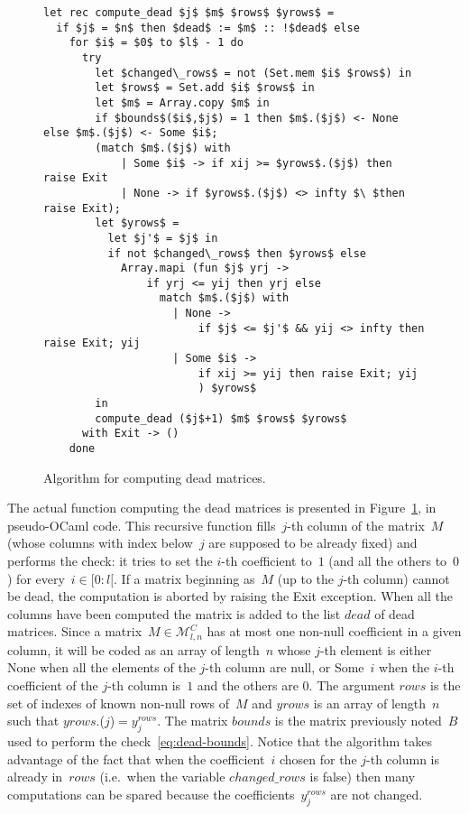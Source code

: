 \documentclass[orivec]{llncs} \usepackage[T1]{fontenc}
\newcommand{\Nint}[2]{[#1:#2[}
\newcommand{\ie}{i.e.~}
\newcommand{\Mat}{\mathcal{M}}
\begin{document}
\begin{figure}[t]
{  \centering
{\small
\begin{lstlisting}
let rec compute_dead $j$ $m$ $rows$ $yrows$ =
  if $j$ = $n$ then $dead$ := $m$ :: !$dead$ else
    for $i$ = $0$ to $l$ - 1 do
      try
        let $changed\_rows$ = not (Set.mem $i$ $rows$) in
        let $rows$ = Set.add $i$ $rows$ in
        let $m$ = Array.copy $m$ in
        if $bounds$($i$,$j$) = 1 then $m$.($j$) <- None else $m$.($j$) <- Some $i$;
        (match $m$.($j$) with
            | Some $i$ -> if xij >= $yrows$.($j$) then raise Exit
            | None -> if $yrows$.($j$) <> infty $\ $then raise Exit);
        let $yrows$ =
          let $j'$ = $j$ in
          if not $changed\_rows$ then $yrows$ else
            Array.mapi (fun $j$ yrj ->
                if yrj <= yij then yrj else
                  match $m$.($j$) with
                    | None ->
                        if $j$ <= $j'$ && yij <> infty then raise Exit; yij
                    | Some $i$ ->
                        if xij >= yij then raise Exit; yij
                        ) $yrows$
        in
        compute_dead ($j$+1) $m$ $rows$ $yrows$
      with Exit -> ()
    done
\end{lstlisting}
}
}
 \vspace{-3ex}
 \caption{Algorithm for computing dead matrices.}
 \label{fig:dead-algo}
 \vspace{-4ex}
\end{figure}

The actual function computing the dead matrices is presented in
Figure~\ref{fig:dead-algo}, in pseudo-OCaml code. This recursive function
fills~$j$-th column of the matrix~$M$ (whose columns with index below~$j$ are
supposed to be already fixed) and performs the check: it tries to set the $i$-th
coefficient to~$1$ (and all the others to~$0$) for every~$i\in\Nint 0l$. If a
matrix beginning as~$M$ (up to the $j$-th column) cannot be dead, the
computation is aborted by raising the Exit exception. When all the columns have
been computed the matrix is added to the list $dead$ of dead matrices. Since a
matrix~$M\in\Mat^C_{l,n}$ has at most one non-null coefficient in a given
column, it will be coded as an array of length~$n$ whose $j$-th element is
either None when all the elements of the $j$-th column are null, or Some~$i$
when the $i$-th coefficient of the $j$-th column is~$1$ and the others are
$0$. The argument $rows$ is the set of indexes of known non-null rows of~$M$ and
$yrows$ is an array of length~$n$ such that $yrows$.($j$)$=y^{rows}_j$. The
matrix $bounds$ is the matrix previously noted~$B$ used to perform the
check~\eqref{eq:dead-bounds}.
Notice that the algorithm takes advantage of the
fact that when the coefficient~$i$ chosen for the $j$-th column is already
in~$rows$ (\ie when the variable $changed\_rows$ is false) then many
computations can be spared because the coefficients~$y^{rows}_j$ are not
changed.
\end{document}
